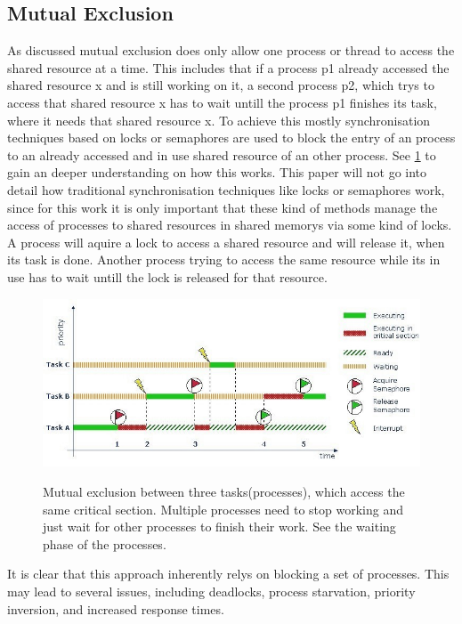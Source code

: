 \subsection{Mutual Exclusion}\label{subsec:mutual-exclusion}

As discussed mutual exclusion does only allow one process or thread to access the shared resource at a time. This includes that if a process p1 already accessed the shared resource x and is still working on it, a second process p2, which trys to access that shared resource x has to wait untill the process p1 finishes its task, where it needs that shared resource x. To achieve this mostly synchronisation techniques based on locks or semaphores are used to block the entry of an process to an already accessed and in use shared resource of an other process. See \cref{fig:mutual-exclusion} to gain an deeper understanding on how this works. This paper will not go into detail how traditional synchronisation techniques like locks or semaphores work, since for this work it is only important that these kind of methods manage the access of processes to shared resources in shared memorys via some kind of locks. A process will aquire a lock to access a shared resource and will release it, when its task is done. Another process trying to access the same resource while its in use has to wait untill the lock is released for that resource.

\begin{figure}[!ht]
   \centering
   \captionsetup{justification=centering}
   \caption{Mutual exclusion between three tasks(processes), which access the same critical section. Multiple processes need to stop working and just wait for other processes to finish their work. See the waiting phase of the processes. \cite{MutualExclusion}}
   \includegraphics[width=135mm]{images/mutual_exclusion.jpg}
   \label{fig:mutual-exclusion}
\end{figure}

It is clear that this approach inherently relys on blocking a set of processes. This may lead to several issues, including deadlocks, process starvation, priority inversion, and increased response times. \cite{brandenburg2019multiprocessorrealtimelockingprotocols,MutexSemaphoreIPC}

